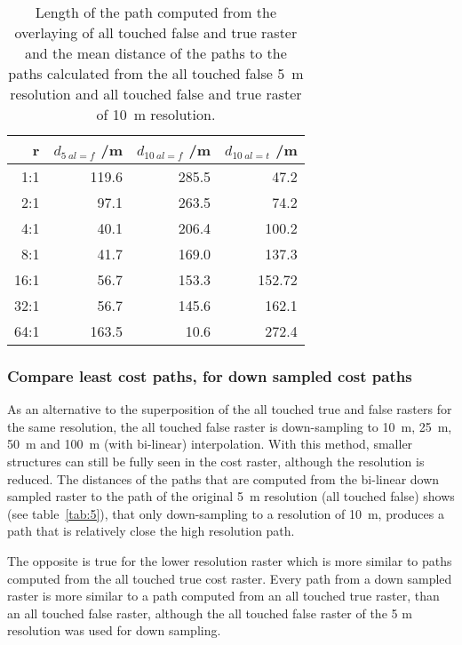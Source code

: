 \begin{table}[h!]
	\caption{Length of the path computed from the overlaying of all touched false and true raster and the mean distance of the paths to the paths calculated from the all touched false 5~m resolution  and all touched false and true raster of 10~m resolution.}
	\label{tab:4}
	\centering
	\begin{tabular}{ r  r  r  r}
		r & $d_{5~al=f}$ /m &  $d_{10~al=f}$ /m & $d_{10~al=t}$ /m \\
		\hline
		
		  1:1  &    119.6 &  285.5 &  47.2\\
		  2:1  &    97.1 &  263.5 &  74.2\\
		  4:1  &    40.1 &  206.4 & 100.2\\
		  8:1  &    41.7 &  169.0 & 137.3\\
		 16:1  &    56.7 &  153.3 & 152.72\\
		 32:1  &    56.7 &  145.6 & 162.1\\
		 64:1  &   163.5 &   10.6 & 272.4\\
		
	\end{tabular}
\end{table}


\subsubsection{Compare least cost paths, for down sampled cost paths}

As an alternative to the superposition of the all touched true and false rasters for the same resolution, the all touched false raster is down-sampling to 10~m, 25~m, 50~m and 100~m (with bi-linear) interpolation.
With this method, smaller structures can still be fully seen in the cost raster, although the resolution is reduced.
The distances of the paths that are computed from the bi-linear down sampled raster to the path of the original 5~m resolution (all touched false) shows (see table~\ref{tab:5}), that only down-sampling to a resolution of 10~m, produces a path that is relatively close the high resolution path.

The opposite is true for the lower resolution raster which is more similar to paths computed from the all touched true cost raster.
Every path from a down sampled raster is more similar to a path computed from an all touched true raster, than an all touched false raster, although the all touched false raster of the 5 m resolution was used for down sampling.

